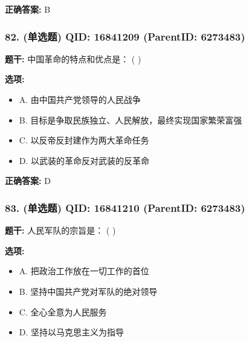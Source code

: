 \documentclass[12pt,UTF8]{ctexart}
\begin{document}
\textbf{正确答案:}
B

\vspace{0.3em}\hrulefill\vspace{0.7em}

\subsubsection*{82. (单选题) \small QID: 16841209 (ParentID: 6273483)}

\textbf{题干:}
中国革命的特点和优点是： ( )



\textbf{选项:}
\begin{itemize}[leftmargin=*]

  \item A. 由中国共产党领导的人民战争

  \item B. 目标是争取民族独立、人民解放，最终实现国家繁荣富强

  \item C. 以反帝反封建作为两大革命任务

  \item D. 以武装的革命反对武装的反革命

\end{itemize}

\textbf{正确答案:}
D

\vspace{0.3em}\hrulefill\vspace{0.7em}

\subsubsection*{83. (单选题) \small QID: 16841210 (ParentID: 6273483)}

\textbf{题干:}
人民军队的宗旨是： ( )



\textbf{选项:}
\begin{itemize}[leftmargin=*]

  \item A. 把政治工作放在一切工作的首位

  \item B. 坚持中国共产党对军队的绝对领导

  \item C. 全心全意为人民服务

  \item D. 坚持以马克思主义为指导

\end{itemize}
\end{document}
